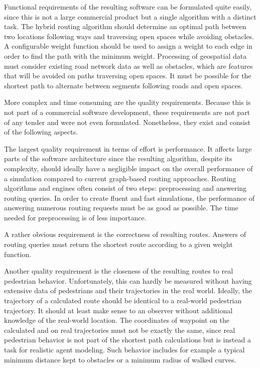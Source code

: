 		Functional requirements of the resulting software can be formulated quite easily, since this is not a large commercial product but a single algorithm with a distinct task.
		The hybrid routing algorithm should determine an optimal path between two locations following ways and traversing open spaces while avoiding obstacles.
		A configurable weight function should be used to assign a weight to each edge in order to find the path with the minimum weight.
		Processing of geospatial data must consider existing road network data as well as obstacles, which are features that will be avoided on paths traversing open spaces.
		It must be possible for the shortest path to alternate between segments following roads and open spaces.
		
		More complex and time consuming are the quality requirements.
		Because this is not part of a commercial software development, these requirements are not part of any tender and were not even formulated.
		Nonetheless, they exist and consist of the following aspects.
	
		The largest quality requirement in terms of effort is performance.
		It affects large parts of the software architecture since the resulting algorithm, despite its complexity, should ideally have a negligible impact on the overall performance of a simulation compared to current graph-based routing approaches.
		Routing algorithms and engines often consist of two steps: preprocessing and answering routing queries.
		In order to create fluent and fast simulations, the performance of answering numerous routing requests must be as good as possible.
		The time needed for preprocessing is of less importance.
		
		A rather obvious requirement is the correctness of resulting routes.
		Answers of routing queries must return the shortest route according to a given weight function.
		
		Another quality requirement is the closeness of the resulting routes to real pedestrian behavior.
		Unfortunately, this can hardly be measured without having extensive data of pedestrians and their trajectories in the real world.
		Ideally, the trajectory of a calculated route should be identical to a real-world pedestrian trajectory.
		It should at least make sense to an observer without additional knowledge of the real-world location.
		The coordinates of waypoint on the calculated and on real trajectories must not be exactly the same, since real pedestrian behavior is not part of the shortest path calculations but is instead a task for realistic agent modeling.
		Such behavior includes for example a typical minimum distance kept to obstacles or a minimum radius of walked curves.
	
